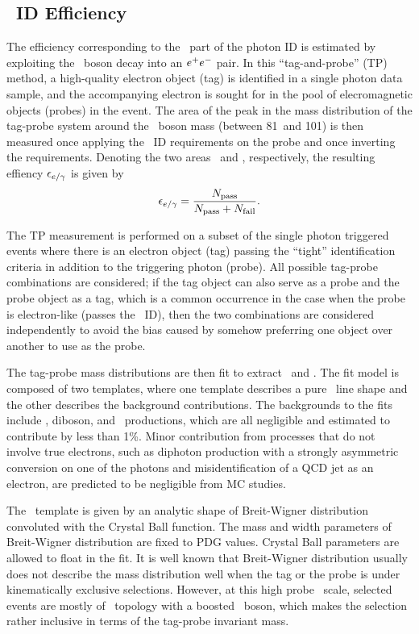 \subsection{\egamma\ ID Efficiency}
\label{subsec:idsf}

The efficiency corresponding to the \egamma\ part of the photon ID is estimated by exploiting the \PZ\ boson decay into an ${e}^{+}{e}^{-}$ pair. 
In this ``tag-and-probe'' (TP) method, a high-quality electron object (tag) is identified in a single photon data sample, and the accompanying electron is sought for in the pool of elecromagnetic objects (probes) in the event. 
The area of the peak in the mass distribution of the tag-probe system around the \PZ\ boson mass (between 81\GeV\ and 101\GeV) is then measured once applying the \Pe\Pgg\ ID requirements on the probe and once inverting the requirements. 
Denoting the two areas \npass\ and \nfail, respectively, the resulting effiency $\epsilon_{{e}/\gamma}$ is given by
\begin{equation}
\epsilon_{{e}/\gamma} = \frac{N_{\text{pass}}}{N_{\text{pass}} + N_{\text{fail}}}.
\end{equation}

The TP measurement is performed on a subset of the single photon triggered events where there is an electron object (tag) passing the ``tight'' identification criteria in addition to the triggering photon (probe). 
All possible tag-probe combinations are considered; if the tag object can also serve as a probe and the probe object as a tag, which is a common occurrence in the case when the probe is electron-like (passes the \Pe\Pgg\ ID), then the two combinations are considered independently to avoid the bias caused by somehow preferring one object over another to use as the probe.

The tag-probe mass distributions are then fit to extract \npass\ and \nfail. 
The fit model is composed of two templates, where one template describes a pure \Zee\ line shape and the other describes the background contributions. 
The backgrounds to the fits include \wj, diboson, and \ttbar\ productions, which are all negligible and estimated to contribute by less than 1\%. 
Minor contribution from processes that do not involve true electrons, such as diphoton production with a strongly asymmetric conversion on one of the photons and misidentification of a QCD jet as an electron, are predicted to be negligible from MC studies.
 
The \Zee\ template is given by an analytic shape of Breit-Wigner distribution convoluted with the Crystal Ball function. 
The mass and width parameters of Breit-Wigner distribution are fixed to PDG values. 
Crystal Ball parameters are allowed to float in the fit. 
It is well known that Breit-Wigner distribution usually does not describe the mass distribution well when the tag or the probe is under kinematically exclusive selections. 
However, at this high probe \pt\ scale, selected events are mostly of \zj\ topology with a boosted \PZ\ boson, which makes the selection rather inclusive in terms of the tag-probe invariant mass.

